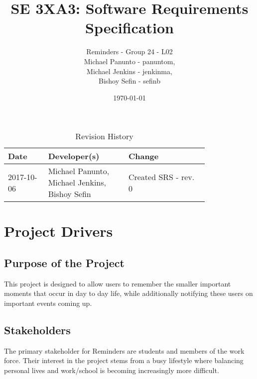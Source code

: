 \documentclass[12pt, titlepage, a4paper]{article}
\title{SE 3XA3: Software Requirements Specification}
\author{
    Reminders - Group 24 - L02\\
    Michael Panunto - panuntom, \\
    Michael Jenkins - jenkinma, \\
    Bishoy Sefin - sefinb
}
\date{\today}
\begin{document}
\setlength{\arrayrulewidth}{1.5pt}

\maketitle


\begin{table}[H]
    \begin{center}
        \caption{Revision History} \label{tab:RevisionHistory}
        \begin{tabular}{l p{0.4\linewidth} p{0.4\linewidth}}
            \hline
            \textbf{Date} & \textbf{Developer(s)} & \textbf{Change} \\
            \hline
            2017-10-06 & Michael Panunto, \newline Michael Jenkins, \newline Bishoy Sefin & Created SRS - rev. 0 \\
            \hline 
        \end{tabular}
    \end{center}
\end{table}

\tableofcontents

\newpage
{}
\section{Project Drivers}

\subsection{Purpose of the Project}
This project is designed to allow users to remember the smaller important moments that occur in day to day life, while additionally notifying these users on important events coming up.

\subsection{Stakeholders}
The primary stakeholder for Reminders are students and members of the work force. Their interest in the project stems from a busy lifestyle where balancing personal lives and work/school is becoming increasingly more difficult.
\end{document}

